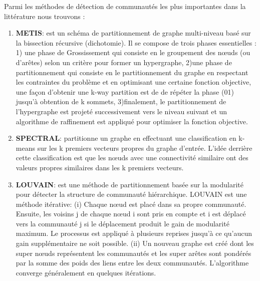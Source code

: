 			Parmi les méthodes de détection de communautés les plus importantes dans la littérature nous trouvons :
			\begin{enumerate}[label=\alph*]
				\item \textbf{METIS\citep{karypis2000multilevel}}: est un schéma de partitionnement de graphe multi-niveau basé sur la bissection récursive (dichotomie). Il se compose de trois phases essentielles : 1) une phase de Grossissement qui consiste en le groupement des nœuds (ou d'arêtes) selon un critère pour former un hypergraphe, 2)une phase de partitionnement qui consiste en le partitionnement du graphe en respectant les contraintes du problème et en optimisant une certaine fonction objective, une façon d'obtenir une k-way partition est de de répéter la phase (01) jusqu'à obtention de k sommets, 3)finalement, le partitionnement de l'hypergraphe est projeté successivement vers le niveau suivant et un algorithme de raffinement est appliqué pour optimiser la fonction objective.
				\item \textbf{SPECTRAL\citep{hespanha2004efficient}}: partitionne un graphe en effectuant une classification en k-means sur les k premiers vecteurs propres du graphe d'entrée. L'idée derrière cette classification est que les nœuds avec une connectivité similaire ont des valeurs propres similaires dans les k premiers vecteurs.
				\item \textbf{LOUVAIN\citep{blondel2008fast}}: est une méthode de partitionnement basée sur la modularité pour détecter la structure de communauté hiérarchique. LOUVAIN est une méthode itérative: (i) Chaque nœud est placé dans sa propre communauté. Ensuite, les voisins j de chaque nœud i sont pris en compte et i est déplacé vers la communauté j si le déplacement produit le gain de modularité maximum. Le processus est appliqué à plusieurs reprises jusqu'à ce qu'aucun gain supplémentaire ne soit possible. (ii) Un nouveau graphe est créé dont les super nœuds représentent les communautés et les super arêtes sont pondérés par la somme des poids des liens entre les deux communautés. L'algorithme converge généralement en quelques itérations.

\end{enumerate}
